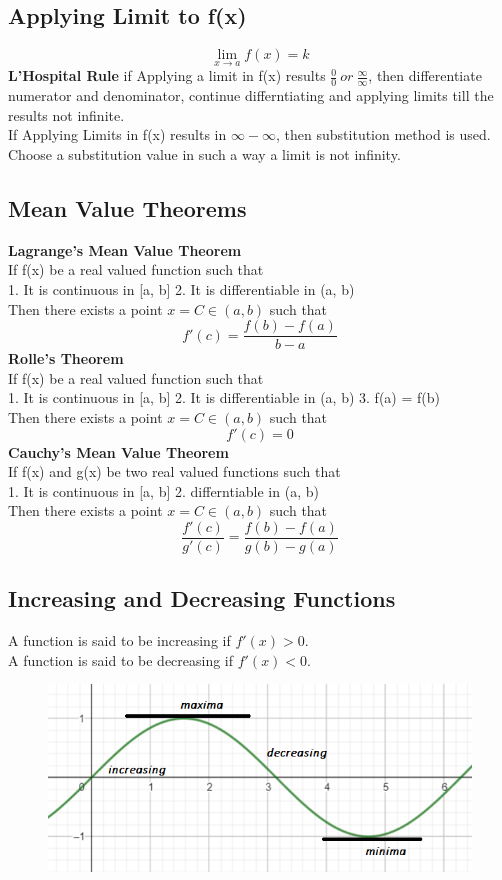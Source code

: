 \subsection*{Applying Limit to f(x)}
\[\lim_{x \to a} f(x) = k\]
\textbf{L'Hospital Rule} if Applying a limit in f(x) results \(\frac{0}{0}\ or\ \frac{\infty}{\infty}\), then differentiate numerator and denominator, continue differntiating and applying limits till the results not infinite.\\
If Applying Limits in f(x) results in \(\infty - \infty\), then substitution method is used. Choose a substitution value in such a way a limit is not infinity.

\subsection{Mean Value Theorems}
\textbf{Lagrange's Mean Value Theorem}\vspace{0.2cm}\\
If f(x) be a real valued function such that \\
1. It is continuous in [a, b] 2. It is differentiable in (a, b) \\
Then there exists a point \(x = C \in (a, b) \) such that
\[f'(c)= \frac{f(b)-f(a)}{b-a}\]
\textbf{Rolle's Theorem}\vspace{0.2cm}\\
If f(x) be a real valued function such that \\
1. It is continuous in [a, b] 2. It is differentiable in (a, b) 3. f(a) = f(b)\\
Then there exists a point \(x = C \in (a, b) \) such that
\[f'(c)=0\] 
\textbf{Cauchy's Mean Value Theorem}\vspace{0.2cm}\\
If f(x) and g(x) be two real valued functions such that\\
1. It is continuous in [a, b] 2. differntiable in (a, b)\\
Then there exists a point \(x = C \in (a, b) \) such that
\[\frac{f'(c)}{g'(c)}=\frac{f(b)-f(a)}{g(b)-g(a)}\]

\subsection*{Increasing and Decreasing Functions}
A function is said to be increasing if \(f'(x) > 0\).\\
A function is said to be decreasing if \(f'(x) < 0\).
\begin{figure}[h!]
    \centering
    \includegraphics[scale=0.775]{images/max-min.png}
\end{figure}

